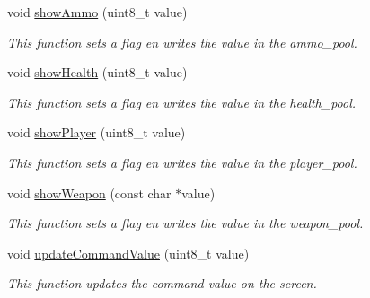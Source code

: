\begin{DoxyCompactItemize}
void \mbox{\hyperlink{class_display_control_a6b4ed1ee72406c1ab082b7c6cf900001}{show\+Ammo}} (uint8\+\_\+t value)
\begin{DoxyCompactList}\small\item\em This function sets a flag en writes the value in the ammo\+\_\+pool. \end{DoxyCompactList}\item 
\mbox{\label{class_display_control_a4cb0b2e7b72f7267531ffb0470216651}} 
void \mbox{\hyperlink{class_display_control_a4cb0b2e7b72f7267531ffb0470216651}{show\+Health}} (uint8\+\_\+t value)
\begin{DoxyCompactList}\small\item\em This function sets a flag en writes the value in the health\+\_\+pool. \end{DoxyCompactList}\item 
\mbox{\label{class_display_control_a1f33d5376aee69c307444fef969a1870}} 
void \mbox{\hyperlink{class_display_control_a1f33d5376aee69c307444fef969a1870}{show\+Player}} (uint8\+\_\+t value)
\begin{DoxyCompactList}\small\item\em This function sets a flag en writes the value in the player\+\_\+pool. \end{DoxyCompactList}\item 
\mbox{\label{class_display_control_a4be28ed55f806917cf4cb7bab68ea6eb}} 
void \mbox{\hyperlink{class_display_control_a4be28ed55f806917cf4cb7bab68ea6eb}{show\+Weapon}} (const char $\ast$value)
\begin{DoxyCompactList}\small\item\em This function sets a flag en writes the value in the weapon\+\_\+pool. \end{DoxyCompactList}\item 
\mbox{\label{class_display_control_ae2d8d0f502941d859639fd46ddd8924b}} 
void \mbox{\hyperlink{class_display_control_ae2d8d0f502941d859639fd46ddd8924b}{update\+Command\+Value}} (uint8\+\_\+t value)
\begin{DoxyCompactList}\small\item\em This function updates the command value on the screen. \end{DoxyCompactList}\item 

\end{DoxyCompactItemize}
